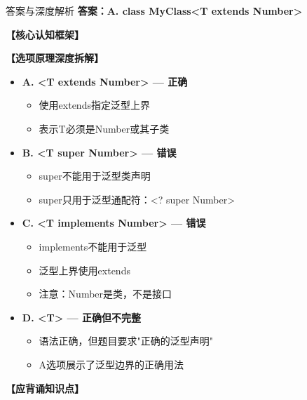 \documentclass[12pt, a4paper]{ctexart}
\begin{document}
\begin{enumerate}[label=\textbf{\arabic*.}]
	      \begin{bluebox}{答案与深度解析}
		      \textbf{答案：A. class MyClass<T extends Number>}

		      \textbf{【核心认知框架】}

		      \textbf{【选项原理深度拆解】}
					  \begin{itemize}[label={}, leftmargin=*, nosep]


		      \item \textbf{A. <T extends Number> — 正确}
					  \begin{itemize}[label={}, nosep]
		      
			      \item 使用extends指定泛型上界
			      \item 表示T必须是Number或其子类
		      

					  \end{itemize}
		      \item \textbf{B. <T super Number> — 错误}
					  \begin{itemize}[label={}, nosep]
		      
			      \item super不能用于泛型类声明
			      \item super只用于泛型通配符：<? super Number>
		      

					  \end{itemize}
		      \item \textbf{C. <T implements Number> — 错误}
					  \begin{itemize}[label={}, nosep]
		      
			      \item implements不能用于泛型
			      \item 泛型上界使用extends
			      \item 注意：Number是类，不是接口
		      

					  \end{itemize}
		      \item \textbf{D. <T> — 正确但不完整}
					  \begin{itemize}[label={}, nosep]
		      
			      \item 语法正确，但题目要求"正确的泛型声明"
			      \item A选项展示了泛型边界的正确用法
		      

		      
					  \end{itemize}
					  \end{itemize}
\textbf{【应背诵知识点】}


\end{bluebox}
\end{enumerate}
\end{document}
